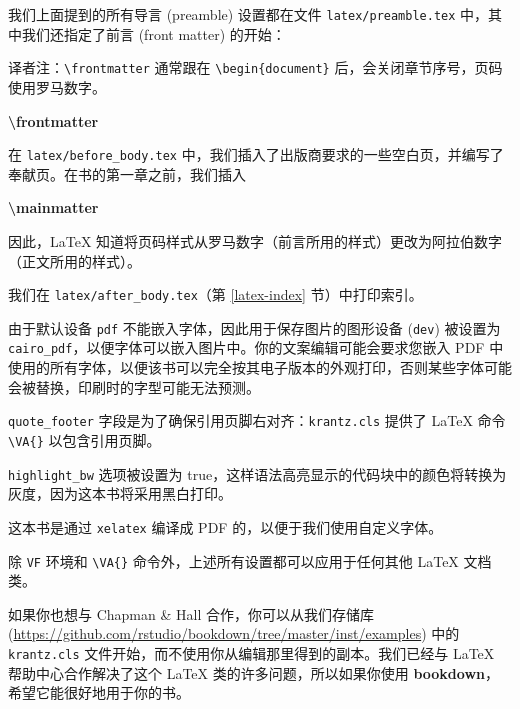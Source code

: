 \documentclass[
  12pt,
]{krantz}
\newenvironment{Shaded}{\begin{snugshade}}{\end{snugshade}}
\newcommand{\FunctionTok}[1]{\textcolor[rgb]{0.13,0.29,0.53}{\textbf{#1}}}
\renewenvironment{quote}{\begin{VF}}{\end{VF}}
\theoremstyle{definition}
\theoremstyle{definition}
\theoremstyle{definition}
\theoremstyle{definition}
\theoremstyle{remark}
\begin{document}
我们上面提到的所有导言 (preamble) 设置都在文件 \texttt{latex/preamble.tex} 中，其中我们还指定了前言 (front matter) 的开始：

\begin{quote}
译者注：\texttt{\textbackslash{}frontmatter} 通常跟在 \texttt{\textbackslash{}begin\{document\}} 后，会关闭章节序号，页码使用罗马数字。
\end{quote}

\begin{Shaded}
\begin{Highlighting}[]
\FunctionTok{\textbackslash{}frontmatter}
\end{Highlighting}
\end{Shaded}

在 \texttt{latex/before\_body.tex} 中，我们插入了出版商要求的一些空白页，并编写了奉献页。在书的第一章之前，我们插入

\begin{Shaded}
\begin{Highlighting}[]
\FunctionTok{\textbackslash{}mainmatter}
\end{Highlighting}
\end{Shaded}

因此，LaTeX 知道将页码样式从罗马数字（前言所用的样式）更改为阿拉伯数字（正文所用的样式）。

我们在 \texttt{latex/after\_body.tex}（第 \ref{latex-index} 节）中打印索引。

由于默认设备 \texttt{pdf} 不能嵌入字体，因此用于保存图片的图形设备 (\texttt{dev}) 被设置为 \texttt{cairo\_pdf}，以便字体可以嵌入图片中。你的文案编辑可能会要求您嵌入 PDF 中使用的所有字体，以便该书可以完全按其电子版本的外观打印，否则某些字体可能会被替换，印刷时的字型可能无法预测。

\texttt{quote\_footer} 字段是为了确保引用页脚右对齐：\texttt{krantz.cls} 提供了 LaTeX 命令 \texttt{\textbackslash{}VA\{\}} 以包含引用页脚。

\texttt{highlight\_bw} 选项被设置为 true，这样语法高亮显示的代码块中的颜色将转换为灰度，因为这本书将采用黑白打印。

这本书是通过 \texttt{xelatex} 编译成 PDF 的，以便于我们使用自定义字体。

除 \texttt{VF} 环境和 \texttt{\textbackslash{}VA\{\}} 命令外，上述所有设置都可以应用于任何其他 LaTeX 文档类。

如果你也想与 Chapman \& Hall 合作，你可以从我们存储库 (\url{https://github.com/rstudio/bookdown/tree/master/inst/examples}) 中的 \texttt{krantz.cls} 文件开始，而不使用你从编辑那里得到的副本。我们已经与 LaTeX 帮助中心合作解决了这个 LaTeX 类的许多问题，所以如果你使用 \textbf{bookdown}，希望它能很好地用于你的书。
\end{document}
